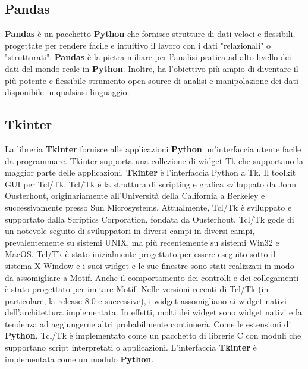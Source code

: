 \subsection{Pandas}
\textbf{Pandas} è un pacchetto \textbf{Python} che fornisce strutture di dati veloci e flessibili, progettate per rendere facile e intuitivo il lavoro con i dati "relazionali" o "strutturati". \textbf{Pandas} è la pietra miliare per l'analisi pratica ad alto livello dei dati del mondo reale in \textbf{Python}. Inoltre, ha l'obiettivo più ampio di diventare il più potente e flessibile strumento open source di analisi e manipolazione dei dati disponibile in qualsiasi linguaggio\cite{reback2020pandas}. 

\subsection{Tkinter}
La libreria \textbf{Tkinter} fornisce alle applicazioni \textbf{Python} un'interfaccia utente facile da programmare. Tkinter supporta una collezione di widget Tk che supportano la maggior parte delle applicazioni. \textbf{Tkinter} è l'interfaccia Python a Tk. Il toolkit GUI per Tcl/Tk. Tcl/Tk è la struttura di scripting e grafica sviluppato da John Ousterhout, originariamente all'Università della California a Berkeley e successivamente presso Sun Microsystems. Attualmente, Tcl/Tk è sviluppato e supportato dalla Scriptics Corporation, fondata da Ousterhout. Tcl/Tk gode di un notevole seguito di sviluppatori in diversi campi in diversi campi, prevalentemente su sistemi UNIX, ma più recentemente su sistemi Win32 e MacOS.\newline
Tcl/Tk è stato inizialmente progettato per essere eseguito sotto il sistema X Window e i suoi widget e le sue finestre sono stati realizzati in modo da assomigliare a Motif. Anche il comportamento dei controlli e dei collegamenti è stato progettato per imitare Motif. Nelle versioni recenti di Tcl/Tk (in particolare, la release 8.0 e successive), i widget assomigliano ai widget nativi dell'architettura implementata. In effetti, molti dei widget sono widget nativi e la tendenza ad aggiungerne altri probabilmente continuerà. Come le estensioni di \textbf{Python}, Tcl/Tk è implementato come un pacchetto di librerie C con moduli che supportano script interpretati o applicazioni. L'interfaccia \textbf{Tkinter} è implementata come un modulo \textbf{Python}\cite{grayson2000python}.

